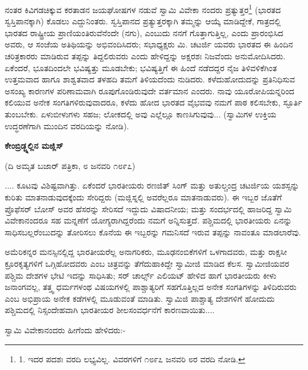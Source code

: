 ನಂತರ ಕಿವಿಗಡಚಿಕ್ಕುವ ಕರತಾಡನ ಜಯಘೋಷಗಳ ನಡುವೆ ಸ್ವಾಮಿ ವಿವೇಕಾ ನಂದರು ಪ್ರತ್ಯುತ್ತರ\footnote{1. ಇದರ ಪದಶಃ ವರದಿ ಲಭ್ಯವಿಲ್ಲ. ವಿವರಗಳಿಗೆ  ೧೮೯೭ ಜನವರಿ ೮ರ  ವರದಿ ನೋಡಿ.} (ಭಾರತದ ಸ್ವಸ್ತಿಪಾನಕ್ಕಾಗಿ) ಕೊಡಲು ಎದ್ದುನಿಂತರು. ಸ್ವಸ್ತಿಪಾನದ ಪ್ರತ್ಯುತ್ತರಕ್ಕಾಗಿ ತಮ್ಮನ್ನು ಆಯ್ಕೆ ಮಾಡಿದ್ದೇಕೆ, ಗಾತ್ರದಲ್ಲಿ ಭಾರತದ ರಾಷ್ಟ್ರೀಯ ಪ್ರಾಣಿಯಂತಿರುವೆನೆಂದೇ (ನಗು), ಎಂಬುದು ನನಗೆ ಗೊತ್ತಾಗುತ್ತಿಲ್ಲ, ಎಂದು ಪ್ರಾರಂಭಿಸಿದ ಅವರು, ಆ ಸಂಜೆಯ ಅತಿಥಿಯನ್ನು ಅಭಿವಂದಿಸಿದರು; ಸಭಾಧ್ಯಕ್ಷರು ಮಿ. ಚಟರ್ಜಿ ಯವರು ಭಾರತದ ಈ ಹಿಂದಿನ ಚರಿತ್ರಕಾರರು ಮಾಡಿರುವ ತಪ್ಪನ್ನು ತಿದ್ದಲಿರುವರು ಎಂದು ಹೇಳಿದ್ದನ್ನು ಅಕ್ಷರಶಃ ನಿಜವೆಂದು ಅನುಮೋದಿಸಿದರು. ಏಕೆಂದರೆ, ಭೂತದಿಂದಲೇ ಭವಿಷ್ಯತ್ತು ಮೂಡಬೇಕು; ಭವಿಷ್ಯತ್ತಿಗೆ ಈ ಹಿಂದೆ ನಡೆದದ್ದರ ನೈಜ ತಿಳಿವಳಿಕೆಗಿಂತ ಉತ್ತಮವಾದ ಹಾಗೂ ಶಾಶ್ವತವಾದ ತಳಹದಿ ತಮಗೆ ತಿಳಿಯದೆಂದು ನುಡಿದರು. ಕಳೆದುಹೋದುದನ್ನು ಪ್ರತಿನಿಧಿಸುವ ಅಸಂಖ್ಯ ಕಾರಣಗಳ ಪರಿಣಾಮವಾಗಿ ರೂಪುಗೊಂಡಿರುವುದೇ ವರ್ತಮಾನ ಎಂದರು. ನಾವು ಯೂರೋಪಿಯನ್ನರಿಂದ ಕಲಿಯುವ ಅನೇಕ ಸಂಗತಿಗಳಿರುವುವಾದರೂ, ಕಳೆದು ಹೋದ ಭಾರತದ ವೈಭವವು ನಮಗೆ ಪಾಠ ಕಲಿಸಬೇಕು, ಸ್ಫೂರ್ತಿ ತುಂಬಬೇಕು. ಏಳುಬೀಳುಗಳು ಸಹಜ; ಲೋಕದಲ್ಲಿ ಅವು ಎಲ್ಲೆಲ್ಲೂ ಕಾಣಸಿಗುವುವು... (ಸ್ವಾಮಿಗಳ ಉಕ್ತಿಯ ಉದ್ಧರಣೆಗಾಗಿ ಮುಂದಿನ ವರದಿಯನ್ನು ನೋಡಿ).

\begin{center}
\textbf{ಕೇಂಬ್ರಿಡ್ಜ್ನಲ್ಲಿನ ಮಜ್ಲಿಸ್}
\end{center}

\begin{center}
(ದಿ ಅಮೃತ ಬಜಾರ್ ಪತ್ರಿಕಾ, ೮ ಜನವರಿ ೧೮೯೭)
\end{center}

.... ಕೂಟವು ವಿಶಿಷ್ಟವಾಗಿತ್ತು. ಏಕೆಂದರೆ ಭಾರತೀಯರು ರಣಜಿತ್ ಸಿಂಗ್ ಮತ್ತು ಅತುಲ್ಚಂದ್ರ ಚಟರ್ಜಿಯ ಯಶಸ್ಸನ್ನು ಕುರಿತು ಮಾತನಾಡುವುದಕ್ಕೆಂದು ಸೇರಿದ್ದರು (ಮಜ್ಲಿಸ್ನಲ್ಲಿ ಅವರೆಲ್ಲರೂ ಮಾತನಾಡುವರು). ಈ ಇಬ್ಬರ ಜೊತೆಗೆ ಪ್ರೊಫೆಸರ್ ಬೋಸ್ ಅವರ ಹೆಸರನ್ನು ಸೇರಿಸದೆ ಇದ್ದುದು ವಿಷಾದನೀಯ; ಮತ್ತು ಸಂದರ್ಭದಲ್ಲಿ ಹಾಜರಿದ್ದ ಸ್ವಾಮಿ ವಿವೇಕಾನಂದರೂ ಸಹ ಮನ್ನಣೆಗೆ ಯೋಗ್ಯರಾಗಿದ್ದರೆಂದು ನಮಗೆ ಅನ್ನಿಸುತ್ತದೆ. ಪಶ್ಚಿಮದಲ್ಲಿ ಭಾರತೀಯರು ಏನನ್ನು ಸಾಧಿಸಬಲ್ಲರೆಂಬುದನ್ನು ತೋರಿಸಲು ಕೊನೆಯ ಈ ಇಬ್ಬರನ್ನು ಗಮನಿಸದೆ ಇರುವ ತಪ್ಪನ್ನು ನಾವಂತೂ ಮಾಡಲಾರೆವು.

ಅಮೆರಿಕನ್ನರ ಮನಸ್ಸಿನಲ್ಲಿದ್ದ ಭಾರತೀಯರೆಲ್ಲ ಅನಾಗರಿಕರು, ಮೂಢನಂಬಿಕೆಗಳಿಗೆ ಒಳಗಾದವರು, ಮತ್ತು ರಾಕ್ಷಸೀ ಕ್ರೂರಕೃತ್ಯಗಳಿಗೆ ಒಗ್ಗಿಹೋದವರು ಎಂಬ ಚಿತ್ರವನ್ನು ತೆಗೆದುಹಾಕಿದ್ದೇ ಸ್ವಾಮೀಜಿ ಮಾಡಿದ ಕೆಲಸ. ಸ್ವಾಮೀಜಿಯವರ ಪಶ್ಚಿಮ ದೇಶಗಳ ಭೇಟಿ ಇದನ್ನು ಸಾಧಿಸಿತು; ಸರ್ ಚಾರ್ಲ್ಸ್ ಎಲಿಯಟ್ ಹೇಳಿದ ಹಾಗೆ ಭಾರತೀಯರು ಕೀಳು ಜನಾಂಗವಲ್ಲ, ತತ್ತ್ವ ಧರ್ಮಗಳಂಥ ವಿಷಯಗಳಲ್ಲಿ ಪಾಶ್ಚಾತ್ಯರಿಗೆ ಸಹಗೊತ್ತಿಲ್ಲದ ಅನೇಕ ಸಂಗತಿಗಳನ್ನು ತಿಳಿದಿರುವರು ಎಂಬ ಅಭಿಪ್ರಾಯ ಅನೇಕ ಕಡೆಗಳಲ್ಲಿ ಮೂಡುವಂತೆ ಮಾಡಿತು. ಸ್ವಾಮಿಜಿ ಪಾಶ್ಚಾತ್ಯ ದೇಶಗಳಿಗೆ ಹೋದುದು ಪಶ್ಚಿಮದಲ್ಲಿ ನಿಸ್ಸಂದೇಹವಾಗಿ ಭಾರತೀಯರ ಶೀಲಸಂವರ್ಧನೆಗೆ ಕಾರಣವಾಯಿತು....

ಸ್ವಾಮಿ ವಿವೇಕಾನಂದರು ಹೀಗೆಂದು ಹೇಳಿದರು:-

